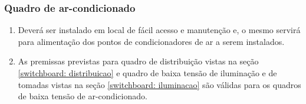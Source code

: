 \subsubsection{Quadro de ar-condicionado}

\begin{enumerate}
	\item Deverá ser instalado em local de fácil acesso e manutenção e, o mesmo servirá para alimentação dos pontos de condicionadores de ar a serem instalados.
	
	\item As premissas previstas para quadro de distribuição vistas na seção \ref{switchboard: distribuicao} e quadro de baixa tensão de iluminação e de tomadas vistas na seção \ref{switchboard: iluminacao} são válidas para os quadros de baixa tensão de ar-condicionado.

\end{enumerate}